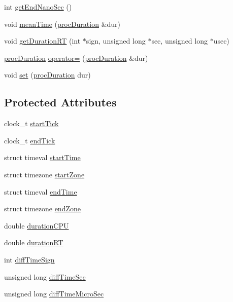 \begin{DoxyCompactItemize}
\item 
int \hyperlink{classprocDuration_a70a14db14b30e3b07af65554686e7d00}{get\-End\-Nano\-Sec} ()
\item 
void \hyperlink{classprocDuration_acf1c2d3c7fbc0cffa3513696c7f73c5a}{mean\-Time} (\hyperlink{classprocDuration}{proc\-Duration} \&dur)
\item 
void \hyperlink{classprocDuration_a4ada382bf6e2dbdca71fc941611fa5cd}{get\-Duration\-R\-T} (int $\ast$sign, unsigned long $\ast$sec, unsigned long $\ast$usec)
\item 
\hyperlink{classprocDuration}{proc\-Duration} \hyperlink{classprocDuration_a9da545dc00a5a8222b6731a62a44c3c5}{operator=} (\hyperlink{classprocDuration}{proc\-Duration} \&dur)
\item 
void \hyperlink{classprocDuration_a875e4c92cca07739eae35e0a7674c90f}{set} (\hyperlink{classprocDuration}{proc\-Duration} dur)
\end{DoxyCompactItemize}
\subsection*{Protected Attributes}
\begin{DoxyCompactItemize}
\item 
clock\-\_\-t \hyperlink{classprocDuration_a6305985898bc3c56d96bbbd315dce3d2}{start\-Tick}
\item 
clock\-\_\-t \hyperlink{classprocDuration_afb5dcb82095eed3ed2c16146c19cf448}{end\-Tick}
\item 
struct timeval \hyperlink{classprocDuration_a1f7a4f39023ba5f5786644e91f03ab7d}{start\-Time}
\item 
struct timezone \hyperlink{classprocDuration_a3a5ebfdf4aaaa8dacefefab93ef1ce40}{start\-Zone}
\item 
struct timeval \hyperlink{classprocDuration_aec55f4ad78f358669b7880083ac355a5}{end\-Time}
\item 
struct timezone \hyperlink{classprocDuration_a3f2c2451dc709af15bd6bf65b3308be4}{end\-Zone}
\item 
double \hyperlink{classprocDuration_a982ff57adecc307bf8daf6c3c5902414}{duration\-C\-P\-U}
\item 
double \hyperlink{classprocDuration_a1e3016ca8a92332b6f1427a9d008aeef}{duration\-R\-T}
\item 
int \hyperlink{classprocDuration_a72be56dcf2e5d2867b20e690f2796ef0}{diff\-Time\-Sign}
\item 
unsigned long \hyperlink{classprocDuration_ac9241af8f9ea5efa568e636683c22446}{diff\-Time\-Sec}
\item 
unsigned long \hyperlink{classprocDuration_a51854eb886bc5a872d2b930de46132e5}{diff\-Time\-Micro\-Sec}
\end{DoxyCompactItemize}
